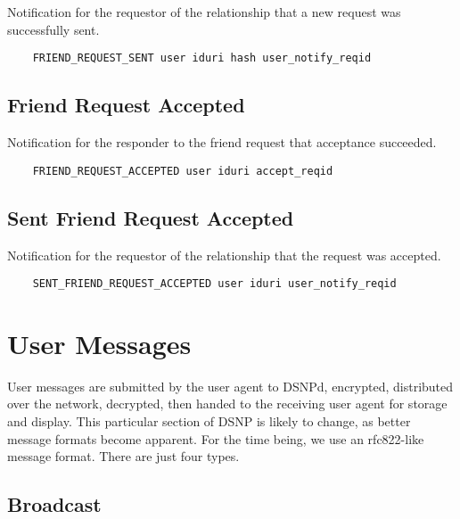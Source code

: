 \documentclass[letterpaper,11pt,oneside]{article}
\begin{document}
Notification for the requestor of the relationship that a new request was
successfully sent.

\vspace{10pt}
\begin{verbatim}
    FRIEND_REQUEST_SENT user iduri hash user_notify_reqid
\end{verbatim}
\vspace{10pt}

\subsection{Friend Request Accepted}

Notification for the responder to the friend request that acceptance succeeded.

\vspace{10pt}
\begin{verbatim}
    FRIEND_REQUEST_ACCEPTED user iduri accept_reqid
\end{verbatim}
\vspace{10pt}

\subsection{Sent Friend Request Accepted}

Notification for the requestor of the relationship that the request was
accepted.

\vspace{10pt}
\begin{verbatim}
    SENT_FRIEND_REQUEST_ACCEPTED user iduri user_notify_reqid
\end{verbatim}
\vspace{10pt}

\section{User Messages}

User messages are submitted by the user agent to DSNPd, encrypted, distributed
over the network, decrypted, then handed to the receiving user agent for
storage and display. This particular section of DSNP is likely to change, as
better message formats become apparent. For the time being, we use an
rfc822-like message format. There are just four types.

\subsection{Broadcast}
\end{document}
